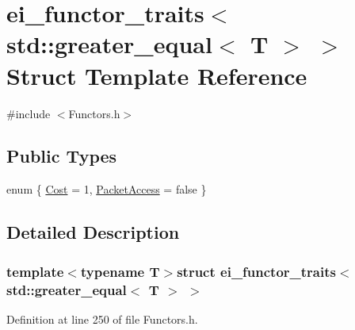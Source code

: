 \hypertarget{structei__functor__traits_3_01std_1_1greater__equal_3_01_t_01_4_01_4}{\section{ei\-\_\-functor\-\_\-traits$<$ std\-:\-:greater\-\_\-equal$<$ T $>$ $>$ Struct Template Reference}
\label{structei__functor__traits_3_01std_1_1greater__equal_3_01_t_01_4_01_4}
}


{\ttfamily \#include $<$Functors.\-h$>$}

\subsection*{Public Types}
\begin{DoxyCompactItemize}
\item 
enum \{ \hyperlink{structei__functor__traits_3_01std_1_1greater__equal_3_01_t_01_4_01_4_a923e8cf9c15eb553bacac85c5b8565d7ac83170f826bd14a9312206fe59210072}{Cost} = 1, 
\hyperlink{structei__functor__traits_3_01std_1_1greater__equal_3_01_t_01_4_01_4_a923e8cf9c15eb553bacac85c5b8565d7a5cd5e7ea959057d951f7016ca3ba0e3f}{Packet\-Access} = false
 \}
\end{DoxyCompactItemize}


\subsection{Detailed Description}
\subsubsection*{template$<$typename T$>$struct ei\-\_\-functor\-\_\-traits$<$ std\-::greater\-\_\-equal$<$ T $>$ $>$}



Definition at line 250 of file Functors.\-h.



